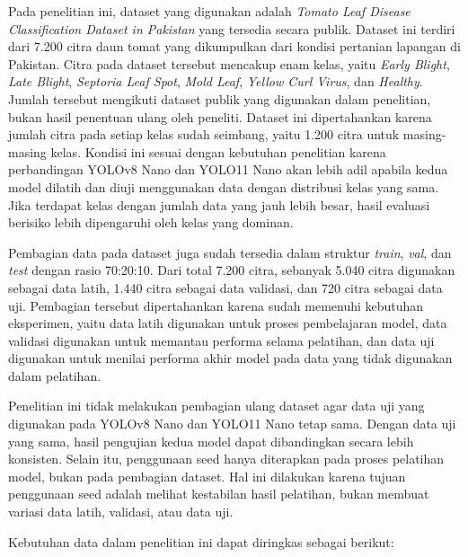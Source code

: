 \begin{sectioncontent}
\begin{subsectioncontent}
        Pada penelitian ini, dataset yang digunakan adalah \textit{Tomato Leaf Disease Classification Dataset in Pakistan} \citep{malik2026dataset} yang tersedia secara publik. Dataset ini terdiri dari 7.200 citra daun tomat yang dikumpulkan dari kondisi pertanian lapangan di Pakistan. Citra pada dataset tersebut mencakup enam kelas, yaitu \textit{Early Blight}, \textit{Late Blight}, \textit{Septoria Leaf Spot}, \textit{Mold Leaf}, \textit{Yellow Curl Virus}, dan \textit{Healthy}. Jumlah tersebut mengikuti dataset publik yang digunakan dalam penelitian, bukan hasil penentuan ulang oleh peneliti. Dataset ini dipertahankan karena jumlah citra pada setiap kelas sudah seimbang, yaitu 1.200 citra untuk masing-masing kelas. Kondisi ini sesuai dengan kebutuhan penelitian karena perbandingan YOLOv8 Nano dan YOLO11 Nano akan lebih adil apabila kedua model dilatih dan diuji menggunakan data dengan distribusi kelas yang sama. Jika terdapat kelas dengan jumlah data yang jauh lebih besar, hasil evaluasi berisiko lebih dipengaruhi oleh kelas yang dominan.

        Pembagian data pada dataset juga sudah tersedia dalam struktur \textit{train}, \textit{val}, dan \textit{test} dengan rasio 70:20:10. Dari total 7.200 citra, sebanyak 5.040 citra digunakan sebagai data latih, 1.440 citra sebagai data validasi, dan 720 citra sebagai data uji. Pembagian tersebut dipertahankan karena sudah memenuhi kebutuhan eksperimen, yaitu data latih digunakan untuk proses pembelajaran model, data validasi digunakan untuk memantau performa selama pelatihan, dan data uji digunakan untuk menilai performa akhir model pada data yang tidak digunakan dalam pelatihan.

        Penelitian ini tidak melakukan pembagian ulang dataset agar data uji yang digunakan pada YOLOv8 Nano dan YOLO11 Nano tetap sama. Dengan data uji yang sama, hasil pengujian kedua model dapat dibandingkan secara lebih konsisten. Selain itu, penggunaan seed hanya diterapkan pada proses pelatihan model, bukan pada pembagian dataset. Hal ini dilakukan karena tujuan penggunaan seed adalah melihat kestabilan hasil pelatihan, bukan membuat variasi data latih, validasi, atau data uji.

        Kebutuhan data dalam penelitian ini dapat diringkas sebagai berikut:


\end{subsectioncontent}
\end{sectioncontent}
